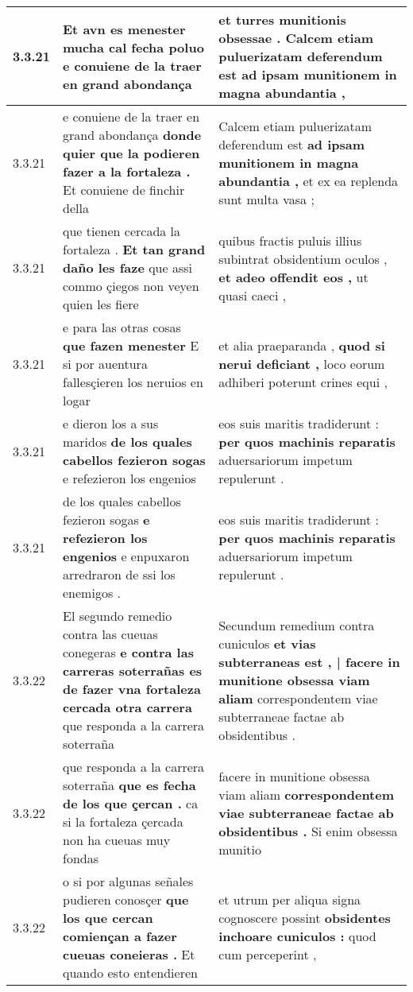 \begin{tabular}{|p{1cm}|p{6.5cm}|p{6.5cm}|}
3.3.21 & Et avn es menester \textbf{ mucha cal fecha poluo } e conuiene de la traer en grand abondança & et turres munitionis obsessae . \textbf{ Calcem etiam puluerizatam deferendum est } ad ipsam munitionem in magna abundantia , \\\hline
3.3.21 & e conuiene de la traer en grand abondança \textbf{ donde quier que la podieren fazer a la fortaleza . } Et conuiene de finchir della & Calcem etiam puluerizatam deferendum est \textbf{ ad ipsam munitionem in magna abundantia , } et ex ea replenda sunt multa vasa ; \\\hline
3.3.21 & que tienen cercada la fortaleza . \textbf{ Et tan grand daño les faze } que assi commo çiegos non veyen quien les fiere & quibus fractis puluis illius subintrat obsidentium oculos , \textbf{ et adeo offendit eos , } ut quasi caeci , \\\hline
3.3.21 & e para las otras cosas \textbf{ que fazen menester } E si por auentura fallesçieren los neruios en logar & et alia praeparanda , \textbf{ quod si nerui deficiant , } loco eorum adhiberi poterunt crines equi , \\\hline
3.3.21 & e dieron los a sus maridos \textbf{ de los quales cabellos fezieron sogas } e refezieron los engenios & eos suis maritis tradiderunt : \textbf{ per quos machinis reparatis } aduersariorum impetum repulerunt . \\\hline
3.3.21 & de los quales cabellos fezieron sogas \textbf{ e refezieron los engenios } e enpuxaron arredraron de ssi los enemigos . & eos suis maritis tradiderunt : \textbf{ per quos machinis reparatis } aduersariorum impetum repulerunt . \\\hline
3.3.22 & El segundo remedio contra las cueuas conegeras \textbf{ e contra las carreras soterrañas es de fazer vna fortaleza cercada otra carrera } que responda a la carrera soterraña & Secundum remedium contra cuniculos \textbf{ et vias subterraneas est , | facere in munitione obsessa viam aliam } correspondentem viae subterraneae factae ab obsidentibus . \\\hline
3.3.22 & que responda a la carrera soterraña \textbf{ que es fecha de los que çercan . } ca si la fortaleza çercada non ha cueuas muy fondas & facere in munitione obsessa viam aliam \textbf{ correspondentem viae subterraneae factae ab obsidentibus . } Si enim obsessa munitio \\\hline
3.3.22 & o si por algunas señales pudieren conosçer \textbf{ que los que cercan comiençan a fazer cueuas coneieras . } Et quando esto entendieren & et utrum per aliqua signa cognoscere possint \textbf{ obsidentes inchoare cuniculos : } quod cum perceperint , \\\hline

\end{tabular}
